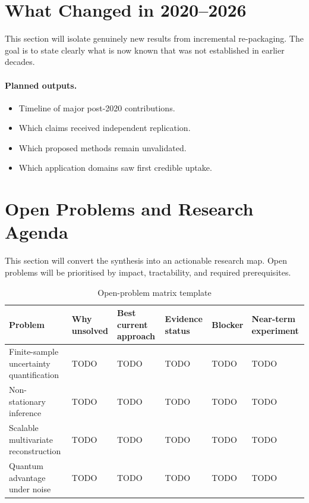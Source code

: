\documentclass[11pt,twocolumn]{article}
\begin{document}
\section{What Changed in 2020--2026}
\label{sec:recent}

This section will isolate genuinely new results from incremental re-packaging.
The goal is to state clearly what is now known that was not established in earlier decades.

\paragraph{Planned outputs.}
\begin{itemize}[nosep]
    \item Timeline of major post-2020 contributions.
    \item Which claims received independent replication.
    \item Which proposed methods remain unvalidated.
    \item Which application domains saw first credible uptake.
\end{itemize}

\section{Open Problems and Research Agenda}
\label{sec:agenda}

This section will convert the synthesis into an actionable research map.
Open problems will be prioritised by impact, tractability, and required prerequisites.

\begin{table}[t]
\centering
\caption{Open-problem matrix template}
\label{tab:open-problems}
\small
\begin{tabular}{llllll}
\toprule
Problem & Why unsolved & Best current approach & Evidence status & Blocker & Near-term experiment \\
\midrule
Finite-sample uncertainty quantification & TODO & TODO & TODO & TODO & TODO \\
Non-stationary inference & TODO & TODO & TODO & TODO & TODO \\
Scalable multivariate reconstruction & TODO & TODO & TODO & TODO & TODO \\
Quantum advantage under noise & TODO & TODO & TODO & TODO & TODO \\
\bottomrule
\end{tabular}
\end{table}
\end{document}
